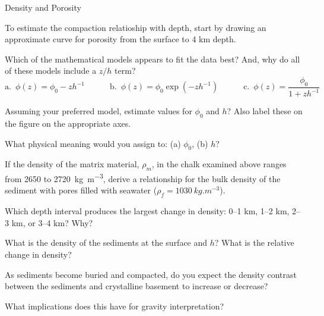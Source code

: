 \begin{activity}{Density and Porosity}
\begin{questions}
    To estimate the compaction relatioship with depth, start by drawing an approximate curve for porosity from the surface to 4 km depth.

    Which of the mathematical models appears to fit the data best?  And, why do all of these models include a $z/h$ term?
    \[ 
      \text{a.}\enspace \phi(z) = \phi_0 - z h^{-1} \hspace{3em}
      \text{b.}\enspace \phi(z) = \phi_0 \exp(-z h^{-1}) \hspace{3em}
      \text{c.}\enspace \phi(z) = {\displaystyle\frac{\phi_0}{1 + z h^{-1}}}
    \]
    \answerbox

    \clearpage
    Assuming your preferred model, estimate values for $\phi_0$ and $h$? Also label these on the figure on the appropriate axes.
    \answerbox

    What physical meaning would you assign to: (a) $\phi_0$, (b) $h$?
    \answerbox

    If the density of the matrix material, $\rho_m$, in the chalk examined above ranges from 2650 to \SI{2720}{kg.m^{-3}}, derive a relationship for the bulk density of the sediment with pores filled with seawater ($\rho_f = \SI{1030}{kg.m^{-3}}$).
    \answerbox

    Which depth interval produces the largest change in density: 0--1 km, 1--2 km, 2--3 km, or 3--4 km?  Why?
    \answerbox[36pt]

    What is the density of the sediments at the surface and $h$?  What is the relative change in density?
    \answerbox

    As sediments become buried and compacted, do you expect the density contrast between the sediments and crystalline basement to increase or decrease?
    \answerbox[24pt]

    What implications does this have for gravity interpretation?
    \answerbox

\end{questions}

\end{activity}